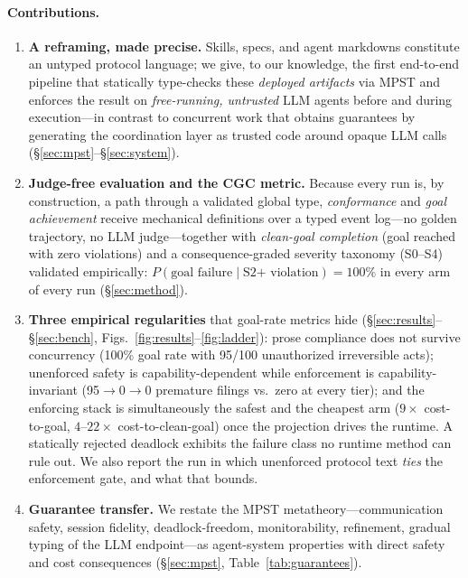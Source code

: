 \documentclass{article}
\begin{document}
\paragraph{Contributions.}
\begin{enumerate}\itemsep2pt
\item \textbf{A reframing, made precise.} Skills, specs, and agent markdowns constitute an untyped protocol language; we give, to our knowledge, the first end-to-end pipeline that statically type-checks these \emph{deployed artifacts} via MPST and enforces the result on \emph{free-running, untrusted} LLM agents before and during execution---in contrast to concurrent work that obtains guarantees by generating the coordination layer as trusted code around opaque LLM calls \citep{bollig26} (\S\ref{sec:mpst}--\S\ref{sec:system}).
\item \textbf{Judge-free evaluation and the CGC metric.} Because every run is, by construction, a path through a validated global type, \emph{conformance} and \emph{goal achievement} receive mechanical definitions over a typed event log---no golden trajectory, no LLM judge---together with \emph{clean-goal completion} (goal reached with zero violations) and a consequence-graded severity taxonomy (S0--S4) validated empirically: $P(\text{goal failure}\mid\text{S2+ violation})=100\%$ in every arm of every run (\S\ref{sec:method}).
\item \textbf{Three empirical regularities} that goal-rate metrics hide (\S\ref{sec:results}--\S\ref{sec:bench}, Figs.~\ref{fig:results}--\ref{fig:ladder}): prose compliance does not survive concurrency (100\% goal rate with 95/100 unauthorized irreversible acts); unenforced safety is capability-dependent while enforcement is capability-invariant (95$\to$0$\to$0 premature filings vs.\ zero at every tier); and the enforcing stack is simultaneously the safest and the cheapest arm ($9\times$ cost-to-goal, $4$--$22\times$ cost-to-clean-goal) once the projection drives the runtime. A statically rejected deadlock exhibits the failure class no runtime method can rule out. We also report the run in which unenforced protocol text \emph{ties} the enforcement gate, and what that bounds.
\item \textbf{Guarantee transfer.} We restate the MPST metatheory---communication safety, session fidelity, deadlock-freedom, monitorability, refinement, gradual typing of the LLM endpoint---as agent-system properties with direct safety and cost consequences (\S\ref{sec:mpst}, Table~\ref{tab:guarantees}).

\end{enumerate}
\end{document}
